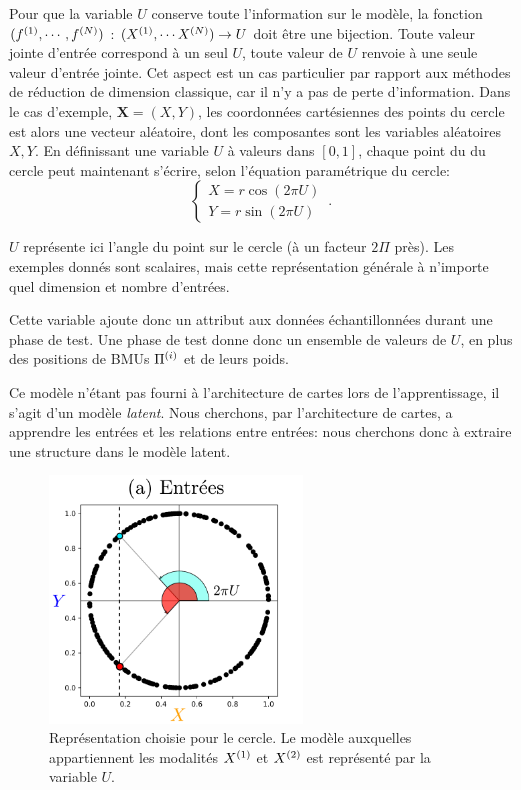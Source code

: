 Pour que la variable $U$ conserve toute l'information sur le modèle, la fonction $(f^{({1})}, \cdots, f^{({N})})$ : $(X^{({1})}, \cdots X^{({N})})\rightarrow U$ doit être une bijection. Toute valeur jointe d'entrée correspond à un seul $U$, toute valeur de $U$ renvoie à une seule valeur d'entrée jointe. 
Cet aspect est un cas particulier par rapport aux méthodes de réduction de dimension classique, car il n'y a pas de perte d'information.
Dans le cas d'exemple, $\mathbf{X} = (X,Y)$, les coordonnées cartésiennes des points du cercle est alors une vecteur aléatoire, dont les composantes sont les variables aléatoires $X,Y$. En définissant une variable $U$ à valeurs dans $[0,1]$, chaque point du du cercle peut maintenant s'écrire, selon l'équation paramétrique du cercle:
\begin{equation}
 \begin{cases}
     X = r  \cos(2\pi U)\\
     Y = r \sin(2 \pi U)
    \end{cases}\,.
\end{equation}

$U$ représente ici l'angle du point sur le cercle (à un facteur $2\Pi$ près). Les exemples donnés sont scalaires, mais cette représentation générale à n'importe quel dimension et nombre d'entrées.

Cette variable ajoute donc un attribut aux données échantillonnées durant une phase de test. Une phase de test donne donc un ensemble de valeurs de $U$, en plus des positions de BMUs $\Pi^{({i})}$ et de leurs poids.


Ce modèle n'étant pas fourni à l'architecture de cartes lors de l'apprentissage, il s'agit d'un modèle \emph{latent}.
Nous cherchons, par l'architecture de cartes, a apprendre les entrées et les relations entre entrées: nous cherchons donc à extraire une structure dans le modèle latent. 

\begin{figure}
\centering
\includegraphics[width=0.6\textwidth]{2som_inp.pdf}
\caption{Représentation choisie pour le cercle. Le modèle auxquelles appartiennent les modalités $X^{({1})}$ et $X^{({2})}$ est représenté par la variable $U$. \label{fig:U}}
\end{figure}


